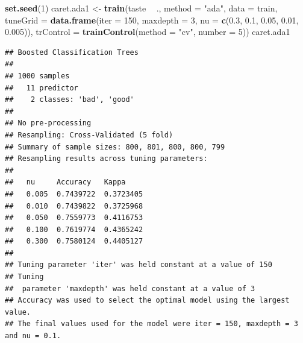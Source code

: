 \documentclass[
  spanish,
]{book}
\newenvironment{Shaded}{\begin{snugshade}}{\end{snugshade}}
\newcommand{\DataTypeTok}[1]{\textcolor[rgb]{0.13,0.29,0.53}{#1}}
\newcommand{\DecValTok}[1]{\textcolor[rgb]{0.00,0.00,0.81}{#1}}
\newcommand{\FloatTok}[1]{\textcolor[rgb]{0.00,0.00,0.81}{#1}}
\newcommand{\KeywordTok}[1]{\textcolor[rgb]{0.13,0.29,0.53}{\textbf{#1}}}
\newcommand{\NormalTok}[1]{#1}
\newcommand{\OperatorTok}[1]{\textcolor[rgb]{0.81,0.36,0.00}{\textbf{#1}}}
\newcommand{\StringTok}[1]{\textcolor[rgb]{0.31,0.60,0.02}{#1}}
\theoremstyle{break}
\theoremstyle{definition}
\theoremstyle{definition}
\theoremstyle{definition}
\theoremstyle{remark}
\begin{document}
\begin{Shaded}
\begin{Highlighting}[]
\KeywordTok{set.seed}\NormalTok{(}\DecValTok{1}\NormalTok{)}
\NormalTok{caret.ada1 <-}\StringTok{ }\KeywordTok{train}\NormalTok{(taste }\OperatorTok{~}\StringTok{ }\NormalTok{., }\DataTypeTok{method =} \StringTok{"ada"}\NormalTok{, }\DataTypeTok{data =}\NormalTok{ train,}
                    \DataTypeTok{tuneGrid =} \KeywordTok{data.frame}\NormalTok{(}\DataTypeTok{iter =}  \DecValTok{150}\NormalTok{, }\DataTypeTok{maxdepth =} \DecValTok{3}\NormalTok{,}
                                 \DataTypeTok{nu =} \KeywordTok{c}\NormalTok{(}\FloatTok{0.3}\NormalTok{, }\FloatTok{0.1}\NormalTok{, }\FloatTok{0.05}\NormalTok{, }\FloatTok{0.01}\NormalTok{, }\FloatTok{0.005}\NormalTok{)),}
                   \DataTypeTok{trControl =} \KeywordTok{trainControl}\NormalTok{(}\DataTypeTok{method =} \StringTok{"cv"}\NormalTok{, }\DataTypeTok{number =} \DecValTok{5}\NormalTok{))}
\NormalTok{caret.ada1}
\end{Highlighting}
\end{Shaded}

\begin{verbatim}
## Boosted Classification Trees 
## 
## 1000 samples
##   11 predictor
##    2 classes: 'bad', 'good' 
## 
## No pre-processing
## Resampling: Cross-Validated (5 fold) 
## Summary of sample sizes: 800, 801, 800, 800, 799 
## Resampling results across tuning parameters:
## 
##   nu     Accuracy   Kappa    
##   0.005  0.7439722  0.3723405
##   0.010  0.7439822  0.3725968
##   0.050  0.7559773  0.4116753
##   0.100  0.7619774  0.4365242
##   0.300  0.7580124  0.4405127
## 
## Tuning parameter 'iter' was held constant at a value of 150
## Tuning
##  parameter 'maxdepth' was held constant at a value of 3
## Accuracy was used to select the optimal model using the largest value.
## The final values used for the model were iter = 150, maxdepth = 3 and nu = 0.1.
\end{verbatim}

\begin{Shaded}
\end{Shaded}
\end{document}
